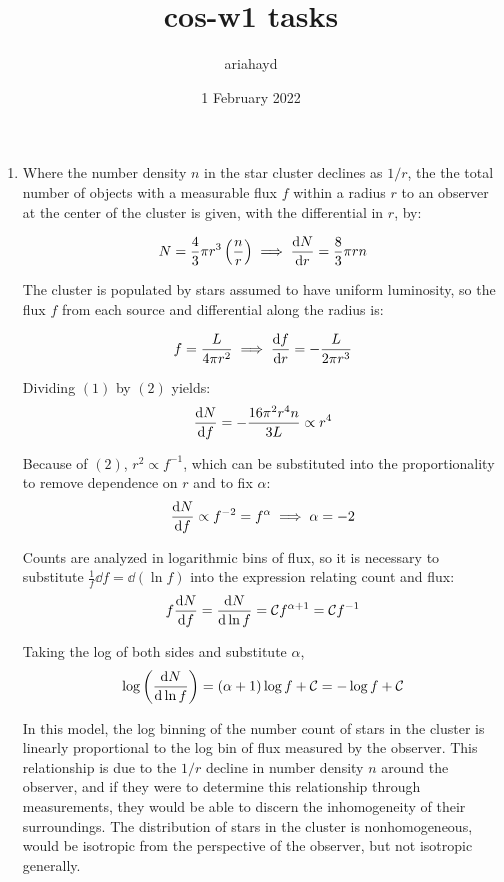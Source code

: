 \documentclass{paper}
\title{cos-w1 tasks}
\author{ariahayd}
\date{1 February 2022}
\begin{document}
 

\maketitle

\begin{enumerate}
    \item 
      Where the number density $n$ in the star cluster declines as 
      $1/r$, the the total number of objects with a measurable flux 
      $f$ within a radius $r$ to an observer at the center of the cluster 
      is given, with the differential in $r$, by: 

      \begin{equation}
        N = \frac{4}{3} \pi r^3 \left( \frac{n}{r} \right) \implies 
        \dv{N}{r} = \frac{8}{3} \pi r n
      \end{equation}

      The cluster is populated by stars assumed to have uniform luminosity, 
      so the flux $f$ from each source and differential along the radius is:

      \begin{equation}
        f = \frac{L}{4 \pi r^2} \implies \dv{f}{r} = -\frac{L}{2 \pi r^3}
      \end{equation}

      Dividing $(1)$ by $(2)$ yields:
      \[ \dv{N}{f} = -\frac{16 \pi^2 r^4 n }{3 L} \propto r^4 \]

      Because of $(2)$, $r^2 \propto f^{-1}$, which can be substituted into 
      the proportionality to remove dependence on $r$ and to fix $\alpha$:
      \[  \dv{N}{f} \propto f^{-2} = f^{\alpha} \implies \alpha = -2 \]

      Counts are analyzed in logarithmic bins of flux, so it is necessary to
      substitute $\frac{1}{f}\dd{f} = \dd{(\ln{f})}$ into the expression 
      relating count and flux:
      \[ f \dv{N}{f} = \dv{N}{\ln{f}}
      = \mathcal{C} f^{\alpha + 1} = \mathcal{C} f^{-1} \]

      Taking the log of both sides and substitute $\alpha$,
      \[ \log{\left(\dv{N}{\ln{f}}\right)} = (\alpha + 1)\log{f} + \mathcal{C}
      = -\log{f} + \mathcal{C} \]

      In this model, the log binning of the number count of stars in the
      cluster is linearly proportional to the log bin of flux measured by
      the observer. This relationship is due to the $1/r$ decline in number
      density $n$ around the observer, and if they were to determine this
      relationship through measurements, they would be able to discern the
      inhomogeneity of their surroundings. The distribution of stars in the
      cluster is nonhomogeneous, would be isotropic from the perspective of 
      the observer, but not isotropic generally.


\end{enumerate}
\end{document}
